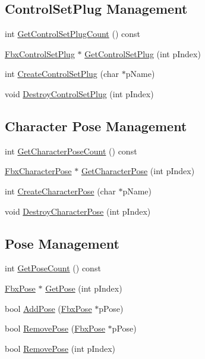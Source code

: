 \subsection*{Control\+Set\+Plug Management}
\begin{DoxyCompactItemize}
\item 
int \hyperlink{class_fbx_scene_a03a1a3f0153d9aa882eaa9c550fd9127}{Get\+Control\+Set\+Plug\+Count} () const
\item 
\hyperlink{class_fbx_control_set_plug}{Fbx\+Control\+Set\+Plug} $\ast$ \hyperlink{class_fbx_scene_aaa152051d6af46baf4e56fc517d7fe19}{Get\+Control\+Set\+Plug} (int p\+Index)
\item 
int \hyperlink{class_fbx_scene_a1496eb0d5cdc26a33f1da631fbc1f047}{Create\+Control\+Set\+Plug} (char $\ast$p\+Name)
\item 
void \hyperlink{class_fbx_scene_a7175cf4e931920126c9c051abbb5a884}{Destroy\+Control\+Set\+Plug} (int p\+Index)
\end{DoxyCompactItemize}
\subsection*{Character Pose Management}
\begin{DoxyCompactItemize}
\item 
int \hyperlink{class_fbx_scene_a172e1ef47648e5271fc5f7c19e66692f}{Get\+Character\+Pose\+Count} () const
\item 
\hyperlink{class_fbx_character_pose}{Fbx\+Character\+Pose} $\ast$ \hyperlink{class_fbx_scene_a5e8a233241054d2bbe551fec35f7afb6}{Get\+Character\+Pose} (int p\+Index)
\item 
int \hyperlink{class_fbx_scene_aec8727602ce4d2a91448cc42c083e5a3}{Create\+Character\+Pose} (char $\ast$p\+Name)
\item 
void \hyperlink{class_fbx_scene_ac7c105c120c3df3e757354e843c027f1}{Destroy\+Character\+Pose} (int p\+Index)
\end{DoxyCompactItemize}
\subsection*{Pose Management}
\begin{DoxyCompactItemize}
\item 
int \hyperlink{class_fbx_scene_a0bfae5c6b969cfc49a7b0e3c9e190240}{Get\+Pose\+Count} () const
\item 
\hyperlink{class_fbx_pose}{Fbx\+Pose} $\ast$ \hyperlink{class_fbx_scene_a9148979d7728e7256be7ce52cb100558}{Get\+Pose} (int p\+Index)
\item 
bool \hyperlink{class_fbx_scene_a41080e786745c1ebdc1c86a80a8e7961}{Add\+Pose} (\hyperlink{class_fbx_pose}{Fbx\+Pose} $\ast$p\+Pose)
\item 
bool \hyperlink{class_fbx_scene_ad698fe1d231041b3a8ecf5ae3d1e2e86}{Remove\+Pose} (\hyperlink{class_fbx_pose}{Fbx\+Pose} $\ast$p\+Pose)
\item 
bool \hyperlink{class_fbx_scene_a480cd0951e983a20ae2014a981054db6}{Remove\+Pose} (int p\+Index)
\end{DoxyCompactItemize}
